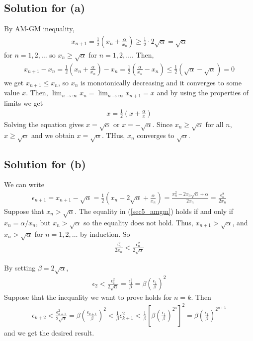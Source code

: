 \documentclass{scrartcl}
\begin{document}
\subsection{Solution for (a)}
By AM-GM inequality,
\begin{align}\label{sec5_amgm}
  x_{n + 1} = \frac{1}{2} \left( x_n + \frac{\alpha}{x_n} \right) \geq \frac{1}{2} \cdot 2 \sqrt{\alpha} = \sqrt{\alpha}
\end{align}
for \(n = 1, 2, \dots\) so \(x_n \geq \sqrt{\alpha}\) for \(n = 1, 2, \dots\).
Then,
\begin{align*}
  x_{n + 1} - x_n = \frac{1}{2} \left( x_n + \frac{\alpha}{x_n} \right) - x_n = \frac{1}{2} \left( \frac{\alpha}{x_n} - x_n \right) \leq \frac{1}{2} (\sqrt{\alpha} - \sqrt{\alpha}) = 0
\end{align*}
we get \(x_{n + 1} \leq x_n\), so \(x_n\) is monotonically decreasing and it converges to some value \(x\).
Then, \(\lim_{n \to \infty} x_n = \lim_{n \to \infty} x_{n + 1} = x\) and by using the properties of limits we get
\begin{align*}
  x = \frac{1}{2} \left( x + \frac{\alpha}{x} \right)
\end{align*}
Solving the equation gives \(x = \sqrt{\alpha}\) or \(x = -\sqrt{\alpha}\).
Since \(x_n \geq \sqrt{\alpha}\) for all \(n\), \(x \geq \sqrt{\alpha}\) and we obtain \(x = \sqrt{\alpha}\).
THus, \(x_n\) converges to \(\sqrt{\alpha}\).

\subsection{Solution for (b)}
We can write
\begin{align*}
  \epsilon_{n + 1} = x_{n + 1} - \sqrt{\alpha} = \frac{1}{2} \left( x_n - 2\sqrt{\alpha} + \frac{\alpha}{x_n} \right) = \frac{x_n^2 - 2x_n\sqrt{\alpha} + \alpha}{2x_n} = \frac{\epsilon_n^2}{2x_n}
\end{align*}
Suppose that \(x_n > \sqrt\alpha\).
The equality in (\ref{sec5_amgm}) holds if and only if \(x_n = \alpha / x_n\), but \(x_n > \sqrt\alpha\) so the equality does not hold.
Thus, \(x_{n + 1} > \sqrt\alpha\), and \(x_n > \sqrt\alpha\) for \(n = 1, 2, \dots\) by induction.
So
\begin{align*}
  \frac{\epsilon_n^2}{2x_n} < \frac{\epsilon_n^2}{2\sqrt\alpha}
\end{align*}

By setting \(\beta = 2\sqrt\alpha\),
\begin{align*}
  \epsilon_2 < \frac{\epsilon_1^2}{2\sqrt\alpha} = \frac{\epsilon_1^2}{\beta} = \beta \left( \frac{\epsilon_1}{\beta} \right)^2
\end{align*}
Suppose that the inequality we want to prove holds for \(n = k\).
Then
\begin{align*}
  \epsilon_{k + 2} < \frac{\epsilon_{k + 1}^2}{2\sqrt\alpha} = \beta \left( \frac{\epsilon_{k + 1}}{\beta} \right)^2 < \frac{1}{\beta} \epsilon_{k + 1}^2 < \frac{1}{\beta} \left[ \beta \left( \frac{\epsilon_1}{\beta} \right)^{2^n} \right]^2 = \beta \left( \frac{\epsilon_1}{\beta} \right)^{2^{n + 1}}
\end{align*}
and we get the desired result.
\end{document}
